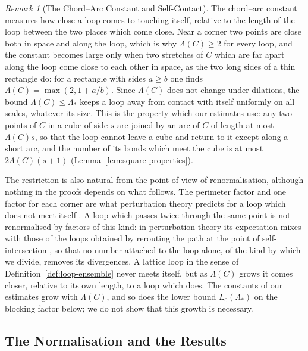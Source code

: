 \documentclass[11pt]{preprint}
\numberwithin{equation}{section}
\theoremstyle{definition}
\theoremstyle{remark}
\newtheorem{remark}[theorem]{Remark}
\theoremstyle{plain}
\begin{document}
\begin{remark}[The Chord--Arc Constant and Self-Contact]\label{rem:chord-arc}
The chord--arc constant measures how close a loop comes to touching itself, relative to the length of the loop between the two places which come close. Near a corner two points are close both in space and along the loop, which is why $\Lambda(C) \geq 2$ for every loop, and the constant becomes large only when two stretches of $C$ which are far apart along the loop come close to each other in space, as the two long sides of a thin rectangle do: for a rectangle with sides $a \geq b$ one finds $\Lambda(C) = \max(2, 1 + a/b)$. Since $\Lambda(C)$ does not change under dilations, the bound $\Lambda(C) \leq \Lambda_*$ keeps a loop away from contact with itself uniformly on all scales, whatever its size. This is the property which our estimates use: any two points of $C$ in a cube of side $s$ are joined by an arc of $C$ of length at most $\Lambda(C)s$, so that the loop cannot leave a cube and return to it except along a short arc, and the number of its bonds which meet the cube is at most $2\Lambda(C)(s + 1)$ (Lemma~\ref{lem:square-properties}).

The restriction is also natural from the point of view of renormalisation, although nothing in the proofs depends on what follows. The perimeter factor and one factor for each corner are what perturbation theory predicts for a loop which does not meet itself \cite{Polyakov,BrandtNeriSato}. A loop which passes twice through the same point is not renormalised by factors of this kind: in perturbation theory its expectation mixes with those of the loops obtained by rerouting the path at the point of self-intersection \cite{BrandtNeriSato}, so that no number attached to the loop alone, of the kind by which we divide, removes its divergences. A lattice loop in the sense of Definition~\ref{def:loop-ensemble} never meets itself, but as $\Lambda(C)$ grows it comes closer, relative to its own length, to a loop which does. The constants of our estimates grow with $\Lambda(C)$, and so does the lower bound $L_0(\Lambda_*)$ on the blocking factor below; we do not show that this growth is necessary.
\end{remark}

\subsection{The Normalisation and the Results}\label{sec:results}
\end{document}
